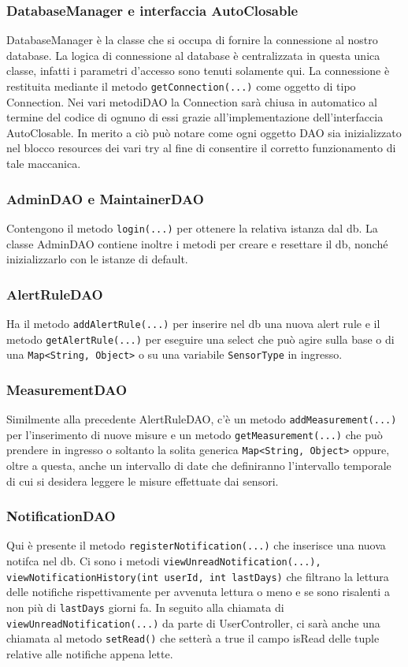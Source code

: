 \documentclass[a4paper, 11pt]{article}
\begin{document}
	\subsubsection{DatabaseManager e interfaccia AutoClosable}
	DatabaseManager è la classe che si occupa di fornire la connessione al nostro database. La logica di connessione al database è centralizzata in questa unica classe, infatti i parametri d'accesso sono tenuti solamente qui. La connessione è restituita mediante il metodo \texttt{getConnection(...)} come oggetto di tipo Connection. Nei vari metodiDAO la Connection sarà chiusa in automatico al termine del codice di ognuno di essi grazie all'implementazione dell'interfaccia AutoClosable. In merito a ciò può notare come ogni oggetto DAO sia inizializzato nel blocco resources dei vari try al fine di consentire il corretto funzionamento di tale maccanica.
	\subsubsection{AdminDAO e MaintainerDAO}
	Contengono il metodo \texttt{login(...)} per ottenere la relativa istanza dal db. La classe AdminDAO contiene inoltre i metodi per creare e resettare il db, nonché inizializzarlo con le istanze di default.
	\subsubsection{AlertRuleDAO}
	Ha il metodo \texttt{addAlertRule(...)} per inserire nel db una nuova alert rule e il metodo \texttt{getAlertRule(...)} per eseguire una select che può agire sulla base o di una \texttt{Map<String, Object>} o su una variabile \texttt{SensorType} in ingresso.
	\subsubsection{MeasurementDAO}
	Similmente alla precedente AlertRuleDAO, c'è un metodo \texttt{addMeasurement(...)} per l'inserimento di nuove misure e un metodo \texttt{getMeasurement(...)} che può prendere in ingresso o soltanto la solita generica \texttt{Map<String, Object>} oppure, oltre a questa, anche un intervallo di date che definiranno l'intervallo temporale di cui si desidera leggere le misure effettuate dai sensori.
	\subsubsection{NotificationDAO}
	Qui è presente il metodo \texttt{registerNotification(...)} che inserisce una nuova notifca nel db. Ci sono i metodi \texttt{viewUnreadNotification(...), viewNotificationHistory(int userId, int lastDays)} che filtrano la lettura delle notifiche rispettivamente per avvenuta lettura o meno e se sono risalenti a non più di \texttt{lastDays} giorni fa. In seguito alla chiamata di \texttt{viewUnreadNotification(...)} da parte di UserController, ci sarà anche una chiamata al metodo \texttt{setRead()} che setterà a true il campo isRead delle tuple relative alle notifiche appena lette.
\end{document}
